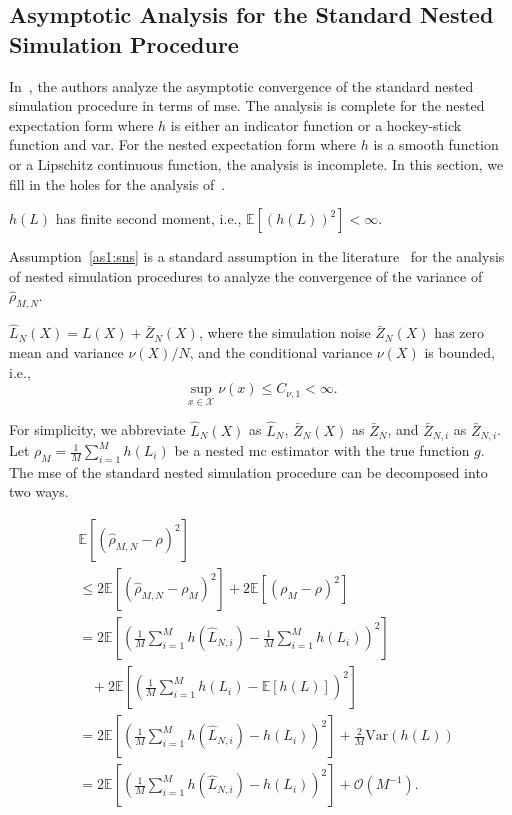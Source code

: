 \subsection{Asymptotic Analysis for the Standard Nested Simulation Procedure}\label{sec1:sns}
In~\cite{gordy2010nested}, the authors analyze the asymptotic convergence of the standard nested simulation procedure in terms of \gls{mse}. 
The analysis is complete for the nested expectation form where $h$ is either an indicator function or a hockey-stick function and \gls{var}. 
For the nested expectation form where $h$ is a smooth function or a Lipschitz continuous function, the analysis is incomplete.
In this section, we fill in the holes for the analysis of~\cite{gordy2010nested}.

\begin{assumption}\label{as1:sns}
    $h(L)$ has finite second moment, i.e., $\mathbb{E} \left[ \left( h(L) \right)^2 \right] < \infty$.
\end{assumption}

Assumption~\ref{as1:sns} is a standard assumption in the literature~\citep{hong2017kernel} for the analysis of nested simulation procedures to analyze the convergence of the variance of $\hat{\rho}_{M, N}$.

\begin{assumption}\label{as1:sns-noise}
    $\hat{L}_N(X) = L(X) + \bar{Z}_N(X)$, where the simulation noise $\bar{Z}_N(X)$ has zero mean and variance $\nu(X) / N$, and the conditional variance $\nu(X)$ is bounded, i.e., 
    $$
        \sup_{x \in \mathcal{X}} \nu(x) \leq C_{\nu, 1} < \infty.
    $$
\end{assumption}

For simplicity, we abbreviate $\hat{L}_N(X)$ as $\hat{L}_N$, $\bar{Z}_N(X)$ as $\bar{Z}_N$, and $\bar{Z}_{N, i}$ as $\bar{Z}_{N, i}$.
Let $\rho_M = \frac{1}{M} \sum_{i=1}^M h(L_i)$ be a nested \gls{mc} estimator with the true function $g$.
The \gls{mse} of the standard nested simulation procedure can be decomposed into two ways.

\begin{align}\label{eq1:mse-sns}
    & \mathbb{E} \left[ \left( \hat{\rho}_{M, N} - \rho \right)^2 \right] \nonumber \\
    & \leq 2 \mathbb{E} \left[ \left( \hat{\rho}_{M, N} - \rho_M \right)^2 \right] 
            + 2  \mathbb{E} \left[ \left(\rho_M - \rho \right)^2 \right]  \nonumber \\
    & = 2 \mathbb{E} \left[  \left( \frac{1}{M} \sum_{i=1}^M h\left( \hat{L}_{N, i} \right) -  \frac{1}{M} \sum_{i=1}^M h\left(L_i \right)  \right)^2\right] \nonumber \\
    & ~~~~ + 2  \mathbb{E} \left[ \left(\frac{1}{M} \sum_{i=1}^M h\left(L_i \right) - \mathbb{E}\left[ h(L)\right] \right)^2 \right]  \nonumber \\
    & = 2 \mathbb{E} \left[  \left( \frac{1}{M} \sum_{i=1}^M h\left( \hat{L}_{N, i} \right) -  h\left(L_i \right)  \right)^2\right] + \frac{2}{M} \text{Var}(h(L)) \nonumber \\
    & = 2 \mathbb{E} \left[  \left( \frac{1}{M} \sum_{i=1}^M h\left( \hat{L}_{N, i} \right) -  h\left(L_i \right)  \right)^2\right] + \mathcal{O}(M^{-1}).
\end{align}

